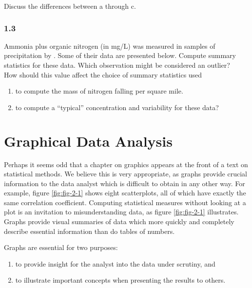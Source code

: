 \documentclass[]{book}
\providecommand{\tightlist}{%
  \setlength{\itemsep}{0pt}\setlength{\parskip}{0pt}}
\begin{document}
Discuss the differences between a through c.

\hypertarget{section-2}{%
\subsection*{1.3}\label{section-2}}

Ammonia plus organic nitrogen (in mg/L) was measured in samples of precipitation by \citet{oltmann_rainfall_1989}. Some of their data are presented below. Compute summary statistics for these data. Which observation might be considered an outlier?\\
How should this value affect the choice of summary statistics used

\begin{enumerate}
\def\labelenumi{\alph{enumi}.}
\tightlist
\item
  to compute the mass of nitrogen falling per square mile.
\item
  to compute a ``typical'' concentration and variability for these data?
\end{enumerate}

\hypertarget{ch2}{%
\chapter{Graphical Data Analysis}\label{ch2}}

Perhaps it seems odd that a chapter on graphics appears at the front of a text on statistical methods. We believe this is very appropriate, as graphs provide crucial information to the data analyst which is difficult to obtain in any other way. For example, figure \ref{fig:fig-2-1} shows eight scatterplots, all of which have exactly the same correlation coefficient. Computing statistical measures without looking at a plot is an invitation to misunderstanding data, as figure \ref{fig:fig-2-1} illustrates. Graphs provide visual summaries of data which more quickly and completely describe essential information than do tables of numbers.

Graphs are essential for two purposes:

\begin{enumerate}
\def\labelenumi{\arabic{enumi}.}
\tightlist
\item
  to provide insight for the analyst into the data under scrutiny, and
\item
  to illustrate important concepts when presenting the results to others.
\end{enumerate}
\end{document}
